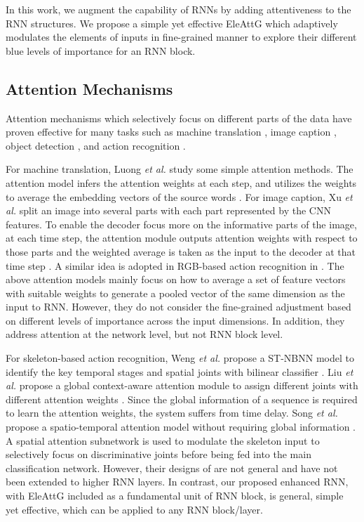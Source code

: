\documentclass[journal]{IEEEtran}
\newcommand{\EleAttGn}{{EleAttG}}
\begin{document}
In this work, we augment the capability of RNNs by adding attentiveness to the RNN structures. We propose a simple yet effective {\EleAttGn} which adaptively modulates the elements of inputs in fine-grained manner to explore their different blue levels of importance for an RNN block.

\subsection{Attention Mechanisms}
Attention mechanisms which selectively focus on different parts of the data have proven effective for many tasks such as machine translation \cite{luong2015effective,vaswani2017attention}, image caption \cite{xu2015show}, object detection \cite{li2017attentive}, and action recognition \cite{sharma2015actionattention,wang2016hierarchical}.

For machine translation, Luong {\it et al.} study some simple attention methods. The attention model infers the attention weights at each step, and utilizes the weights to average the embedding vectors of the source words \cite{luong2015effective}. For image caption, Xu {\it et al.} split an image into several parts with each part represented by the CNN features. To enable the decoder focus more on the informative parts of the image, at each time step, the attention module outputs attention weights with respect to those parts and the weighted average is taken as the input to the decoder at that time step \cite{xu2015show}. A similar idea is adopted in RGB-based action recognition in \cite{sharma2015actionattention}. The above attention models mainly focus on how to  average a set of feature vectors with suitable weights to generate a pooled vector of the same dimension as the input to RNN. However, they do not consider the fine-grained adjustment based on different levels of importance across the input dimensions. In addition, they address attention at the network level, but not RNN block level.

For skeleton-based action recognition,  Weng {\it et al.} propose a ST-NBNN model to identify the key temporal stages and spatial joints with bilinear classifier \cite{weng2017spatio}. Liu {\it et al.} propose a global context-aware attention module to assign different joints with different attention weights \cite{liu2017global}. Since the global information of a sequence is required to learn the attention weights, the system suffers from time delay. Song {\it et al.} propose a spatio-temporal attention model without requiring global information \cite{song2017end}. A spatial attention subnetwork is used to modulate the skeleton input to selectively focus on discriminative joints before being fed into the main classification network. However, their designs of \cite{liu2017global, song2017end}are not general and have not been extended to higher RNN layers. In contrast, our proposed enhanced RNN, with EleAttG included as a fundamental unit of RNN block, is general, simple yet effective, which can be applied to any RNN block/layer. 
\end{document}

